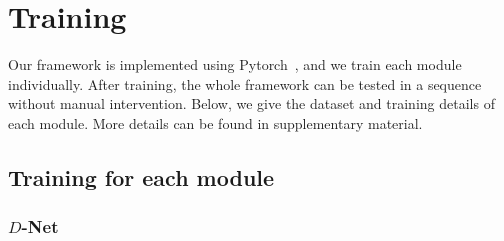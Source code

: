 

\section{Training}
Our framework is implemented using Pytorch~\cite{pytorch}, and we train each module individually. After training, the whole framework can be tested in a sequence without manual intervention. 
Below, we give the dataset and training details of each module.
More details can be found in supplementary material.

\subsection{Training for each module}
\subsubsection{$D$-Net}


